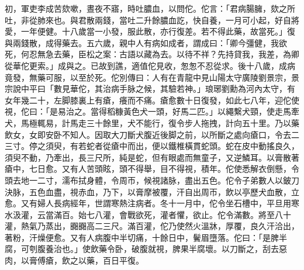 \begin{pinyinscope}
初，軍吏李成苦欬嗽，晝夜不寤，時吐膿血，以問佗。佗言：「君病腸臃，欬之所吐，非從肺來也。與君散兩錢，當吐二升餘膿血訖，快自養，一月可小起，好自將愛，一年便健。十八歲當一小發，服此散，亦行復差。若不得此藥，故當死。」復與兩錢散，成得藥去。五六歲，親中人有病如成者，謂成曰：「卿今彊健，我欲死，何忍無急去藥，臣松之案：古語以藏為去。以待不祥？先持貸我，我差，為卿從華佗更索。」成與之。已故到譙，適值佗見收，怱怱不忍從求。後十八歲，成病竟發，無藥可服，以至於死。佗別傳曰：人有在青龍中見山陽太守廣陵劉景宗，景宗說中平曰「數見華佗，其治病手脉之候，其驗若神。」琅琊劉勳為河內太守，有女年幾二十，左脚膝裏上有瘡，癢而不痛。瘡愈數十日復發，如此七八年，迎佗使視，佗曰：「是易治之。當得稻糠黃色犬一頭，好馬二匹。」以繩繫犬頸，使走馬牽犬，馬極輒易，計馬走三十餘里，犬不能行，復令步人拖拽，計向五十里。乃以藥飲女，女即安卧不知人。因取大刀斷犬腹近後脚之前，以所斷之處向瘡口，令去二三寸。停之須臾，有若蛇者從瘡中而出，便以鐵椎橫貫蛇頭。蛇在皮中動搖良久，須臾不動，乃牽出，長三尺所，純是蛇，但有眼處而無童子，又逆鱗耳。以膏散著瘡中，七日愈。又有人苦頭眩，頭不得舉，目不得視，積年。佗使悉解衣倒懸，令頭去地一二寸，濡布拭身體，令周帀，候視諸脉，盡出五色。佗令子弟數人以鈹刀決脉，五色血盡，視赤血，乃下，以膏摩被覆，汗自出周帀，飲以亭歷犬血散，立愈。又有婦人長病經年，世謂寒熱注病者。冬十一月中，佗令坐石槽中，平旦用寒水汲灌，云當滿百。始七八灌，會戰欲死，灌者懼，欲止。佗令滿數。將至八十灌，熱氣乃蒸出，嚻嚻高二三尺。滿百灌，佗乃使然火溫牀，厚覆，良久汗洽出，著粉，汗燥便愈。又有人病腹中半切痛，十餘日中，鬢眉墮落。佗曰：「是脾半腐，可刳腹養治也。」使飲藥令卧，破腹就視，脾果半腐壞。以刀斷之，刮去惡肉，以膏傅瘡，飲之以藥，百日平復。


\end{pinyinscope}
